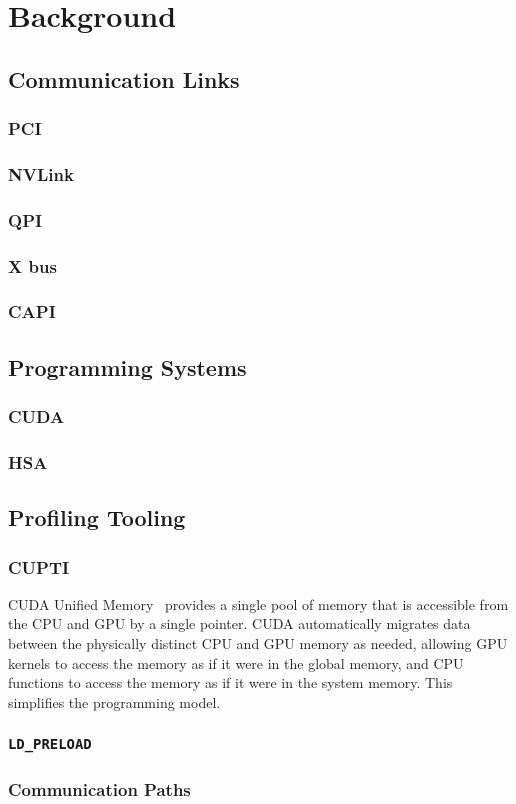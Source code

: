 \chapter{Background}


%
%
%
\section{Communication Links}

\subsection{PCI}
\subsection{NVLink}
\subsection{QPI}
\subsection{X bus}
\subsection{CAPI}

%
%
%
\section{Programming Systems}
\subsection{CUDA}
\label{sec:cuda}
\subsection{HSA}
\label{sec:hsa}


%
%
%
\section{Profiling Tooling}

\subsection{CUPTI}
\label{sec:cupti}

\cite{nvidia2017cupti}

CUDA Unified Memory~\cite{harris2013cudaunifiedmemory} provides a single pool of memory that is accessible from the CPU and GPU by a single pointer.
CUDA automatically migrates data between the physically distinct CPU and GPU memory as needed, allowing GPU kernels to access the memory as if it were in the global memory, and CPU functions to access the memory as if it were in the system memory.
This simplifies the programming model.

\subsection{\texttt{LD\_PRELOAD}}
\label{sec:ldpreload}

\cite{kerrisk2017ld}

\subsection{ Communication Paths}

